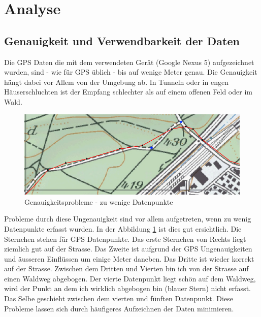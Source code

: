 \clearpage
\section{Analyse}
\subsection{Genauigkeit und Verwendbarkeit der Daten}
\label{subsec:analyseprecision}
Die GPS Daten die mit dem verwendeten Gerät (Google Nexus 5) aufgezeichnet wurden, sind - wie für GPS üblich \cite{gpsprecision} - bis auf wenige Meter genau. Die Genauigkeit hängt dabei vor Allem von der Umgebung ab. In Tunneln oder in engen Häuserschluchten ist der Empfang schlechter als auf einem offenen Feld oder im Wald. 

\begin{figure}[h]
  \centering
  \includegraphics[width=\textwidth]{images/map_issues_10s.png}
  \caption[Genauigkeitsprobleme - zu wenige Datenpunkte]{Genauigkeitsprobleme - zu wenige Datenpunkte}
  \label{fig:precisionissues10s}
\end{figure}

Probleme durch diese Ungenauigkeit sind vor allem aufgetreten, wenn zu wenig Datenpunkte erfasst wurden. In der Abbildung \ref{fig:precisionissues10s} ist dies gut ersichtlich. Die Sternchen stehen für GPS Datenpunkte. Das erste Sternchen von Rechts liegt ziemlich gut auf der Strasse. Das Zweite ist aufgrund der GPS Ungenauigkeiten und äusseren Einflüssen um einige Meter daneben. Das Dritte ist wieder korrekt auf der Strasse. Zwischen dem Dritten und Vierten bin ich von der Strasse auf einen Waldweg abgebogen. Der vierte Datenpunkt liegt schön auf dem Waldweg, wird der Punkt an dem ich wirklich abgebogen bin (blauer Stern) nicht erfasst. Das Selbe geschieht zwischen dem vierten und fünften Datenpunkt. Diese Probleme lassen sich durch häufigeres Aufzeichnen der Daten minimieren.

